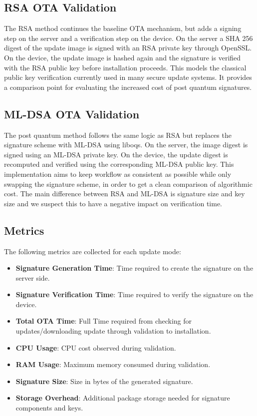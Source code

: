 \documentclass[12pt]{article}
\begin{document}
\subsection{RSA OTA Validation}
The RSA method continues the baseline OTA mechanism, but adds a signing step on the server and a verification step on the device. On the server a SHA 256 digest of the update image is signed with an RSA private key through OpenSSL. On the device, the update image is hashed again and the signature is verified  with the RSA public key before installation proceeds. This models the classical public key verification currently used in many secure update systems. It provides a comparison point for evaluating the increased cost of post quantum signatures. 
\subsection{ML-DSA OTA Validation}
The post quantum method follows the same logic as RSA but replaces the signature scheme with ML-DSA using liboqs. On the server, the image digest is signed using an ML-DSA private key. On the device, the update digest is recomputed and verified using the corresponding ML-DSA public key. This implementation aims to keep workflow as consistent as possible while only swapping the signature scheme, in order to get a clean comparison of algorithmic cost. The main difference between RSA and ML-DSA is signature size and key size and we suspect this to have a negative impact on verification time.
\subsection{Metrics}
The following metrics are collected for each update mode:
\begin{itemize}[leftmargin=2em]
    \item \textbf{Signature Generation Time}: Time required to create the signature on the server side.
    \item \textbf{Signature Verification Time}: Time required to verify the signature on the device. 
    \item \textbf{Total OTA Time}: Full Time required from checking for updates/downloading update through validation to installation.
    \item \textbf{CPU Usage}: CPU cost observed during validation.
     \item \textbf{RAM Usage}: Maximum memory consumed during validation.
     \item \textbf{Signature Size}: Size in bytes of the generated signature.
     \item \textbf{Storage Overhead}: Additional package storage needed for signature components and keys. 
\end{itemize}
\end{document}
